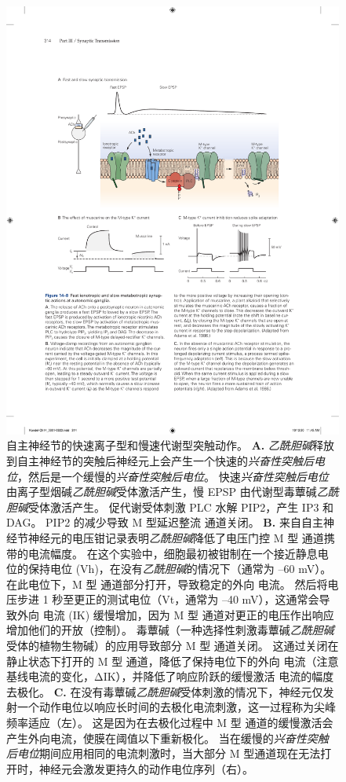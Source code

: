 \begin{figure}[htbp]
	\centering
	\includegraphics[width=0.8\linewidth]{chap14/fig_14_8}
	\caption{自主神经节的快速离子型和慢速代谢型突触动作。
		\textbf{A.} \textit{乙酰胆碱}释放到自主神经节的突触后神经元上会产生一个快速的\textit{兴奋性突触后电位}，然后是一个缓慢的\textit{兴奋性突触后电位}。
		快速\textit{兴奋性突触后电位}由离子型烟碱\textit{乙酰胆碱}受体激活产生，慢 EPSP 由代谢型毒蕈碱\textit{乙酰胆碱}受体激活产生。
		促代谢受体刺激 PLC 水解 PIP2，产生 IP3 和 DAG。 PIP2 的减少导致 M 型延迟整流  通道关闭。
		\textbf{B.} 来自自主神经节神经元的电压钳记录表明\textit{乙酰胆碱}降低了电压门控 M 型  通道携带的电流幅度。
		在这个实验中，细胞最初被钳制在一个接近静息电位的保持电位 (Vh)，在没有\textit{乙酰胆碱}的情况下（通常为 –60 mV）。
		在此电位下，M 型  通道部分打开，导致稳定的外向  电流。
		然后将电压步进 1 秒至更正的测试电位（Vt，通常为 –40 mV），这通常会导致外向  电流 (IK) 缓慢增加，因为 M 型  通道对更正的电压作出响应 增加他们的开放（控制）。
		毒蕈碱（一种选择性刺激毒蕈碱\textit{乙酰胆碱}受体的植物生物碱）的应用导致部分 M 型  通道关闭。
		这通过关闭在静止状态下打开的 M 型  通道，降低了保持电位下的外向  电流（注意基线电流的变化，ΔIK），并降低了响应阶跃的缓慢激活  电流的幅度 去极化\cite{adams1986slow}。
		\textbf{C.} 在没有毒蕈碱\textit{乙酰胆碱}受体刺激的情况下，神经元仅发射一个动作电位以响应长时间的去极化电流刺激，这一过程称为尖峰频率适应（左）。
		这是因为在去极化过程中 M 型  通道的缓慢激活会产生外向电流，使膜在阈值以下重新极化。
		当在缓慢的\textit{兴奋性突触后电位}期间应用相同的电流刺激时，当大部分 M 型通道现在无法打开时，神经元会激发更持久的动作电位序列（右）\cite{adams1986slow}。}
	\label{fig:14_8}
\end{figure}


